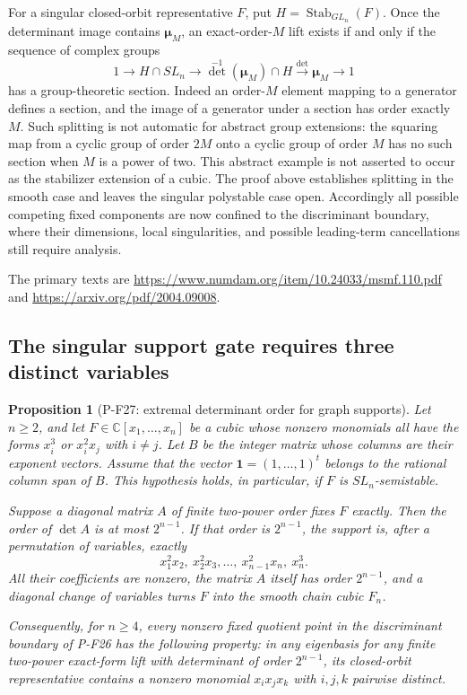 \documentclass[11pt,a4paper]{article}
\newtheorem{proposition}{Proposition}[section]
\begin{document}
For a singular closed-orbit representative $F$, put
$H=\operatorname{Stab}_{GL_n}(F)$. Once the determinant image
contains $\boldsymbol\mu_M$, an exact-order-$M$ lift exists
if and only if the sequence of complex groups
\[
 1\longrightarrow H\cap SL_n\longrightarrow
   \det^{-1}(\boldsymbol\mu_M)\cap H
   \xrightarrow{\det}\boldsymbol\mu_M\longrightarrow1
 \tag{P-F26g}
\]
has a group-theoretic section. Indeed an order-$M$ element
mapping to a generator defines a section, and the image
of a generator under a section has order exactly $M$.
Such splitting is not automatic for abstract group extensions:
the squaring map from a cyclic group of order $2M$ onto a
cyclic group of order $M$ has no such section when $M$ is a
power of two. This abstract example is not asserted to occur
as the stabilizer extension of a cubic. The proof above
establishes splitting in the smooth case and leaves the
singular polystable case open. Accordingly all possible
competing fixed components are now confined to the
discriminant boundary, where their dimensions, local
singularities, and possible leading-term cancellations still
require analysis.

The primary texts are
\url{https://www.numdam.org/item/10.24033/msmf.110.pdf}
and \url{https://arxiv.org/pdf/2004.09008}.


\subsection{The singular support gate requires three distinct variables}

\begin{proposition}[P-F27: extremal determinant order for graph supports]
\label{prop:cubicgraphsupport}
Let $n\ge2$, and let $F\in\mathbb C[x_1,\ldots,x_n]$ be a
cubic whose nonzero monomials all have the forms $x_i^3$ or
$x_i^2x_j$ with $i\ne j$. Let $B$ be the integer matrix whose
columns are their exponent vectors. Assume that the vector
$\mathbf1=(1,\ldots,1)^t$ belongs to the rational column span
of $B$. This hypothesis holds, in particular, if $F$ is
$SL_n$-semistable.

Suppose a diagonal matrix $A$ of finite two-power order fixes
$F$ exactly. Then the order of $\det A$ is at most $2^{n-1}$.
If that order is $2^{n-1}$, the support is, after a permutation
of variables, exactly
\[
 x_1^2x_2,\ x_2^2x_3,\ldots,\ x_{n-1}^2x_n,\ x_n^3.
 \tag{P-F27a}
\]
All their coefficients are nonzero, the matrix $A$ itself has
order $2^{n-1}$, and a diagonal change of variables turns $F$
into the smooth chain cubic $F_n$.

Consequently, for $n\ge4$, every nonzero fixed quotient point
in the discriminant boundary of P-F26 has the following
property: in any eigenbasis for any finite two-power
exact-form lift with determinant of order $2^{n-1}$, its
closed-orbit representative contains a nonzero monomial
$x_ix_jx_k$ with $i,j,k$ pairwise distinct.
\end{proposition}
\end{document}
